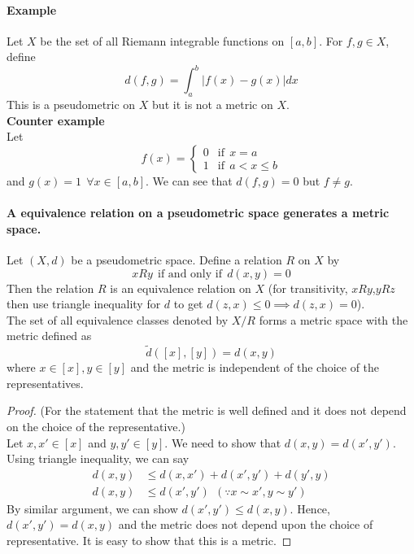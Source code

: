 \documentclass[12pt]{report}
\theoremstyle{definition}
\begin{document}
\paragraph*{Example}
Let $X$ be the set of all Riemann integrable functions on $[a,b]$. For $f,g \in X$, define
$$ d(f,g) = \int_a^b |f(x) - g(x)| dx$$
This is a pseudometric on $X$ but it is not a metric on $X$.\\
\textbf{Counter example}\\
Let
$$ 
f(x) = \begin{cases}
        0 & \text{if}~~x=a\\
        1 & \text{if}~~a < x \leq b
    \end{cases}
$$
and $g(x) = 1~~\forall x \in [a,b]$. We can see that $d(f,g) = 0$ but $f \neq g$.
\paragraph*{A equivalence relation on a pseudometric space generates a metric space. } Let $(X,d)$ be a pseudometric space. Define a relation $R$ on $X$ by 
$$ xRy~~\text{if and only if}~~ d(x,y) = 0$$
Then the relation $R$ is an equivalence relation on $X$ (for transitivity, $xRy$,$yRz$ then use triangle inequality for $d$ to get $d(z,x) \leq 0 \implies d(z,x) = 0$).\\
The set of all equivalence classes denoted by $X/R$ forms a metric space with the metric defined as
$$ \tilde{d}([x],[y]) = d(x,y)$$
where $x \in [x],y \in [y]$ and the metric is independent of the choice of the representatives.
\begin{proof}
    (For the statement that the metric is well defined and it does not depend on the choice of the representative.)\\
    Let $x,x' \in [x]$ and $y,y' \in [y]$. We need to show that $d(x,y) = d(x',y')$. Using triangle inequality, we can say
    \begin{align*}
        d(x,y) &\leq d(x,x') + d(x',y') + d(y',y)\\
        d(x,y) &\leq d(x',y')~~(\because x \sim x', y \sim y')
    \end{align*}
    By similar argument, we can show $d(x',y') \leq d(x,y)$. Hence, $d(x',y') = d(x,y)$ and the metric does not depend upon the choice of representative. It is easy to show that this is a metric.
\end{proof}
\end{document}
